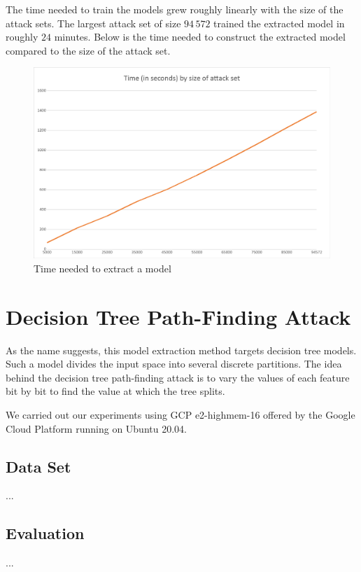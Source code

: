\documentclass[a4paper,11pt]{article}
\begin{document}
    The time needed to train the models grew roughly linearly with the size of the attack sets. The largest attack set of size $94\,572$ trained the extracted model in roughly $24$ minutes. Below is the time needed to construct the extracted model compared to the size of the attack set.
        \begin{figure}[h!]
            \centering      \includegraphics[scale=0.2]{exercise_3/paper/images/Time_copy_cat.png}
            \caption{Time needed to extract a model}
            \label{fig:time_cat}
        \end{figure}
            
\section{Decision Tree Path-Finding Attack}
    As the name suggests, this model extraction method targets decision tree models. Such a model divides the input space into several discrete partitions. The idea behind the decision tree path-finding attack is to vary the values of each feature bit by bit to find the value at which the tree splits.
    
    
    
    We carried out our experiments using GCP e2-highmem-16 offered by the Google Cloud Platform running on Ubuntu 20.04.
    
    \subsection{Data Set}
        ...
        
    \subsection{Evaluation}
        ...
\end{document}
